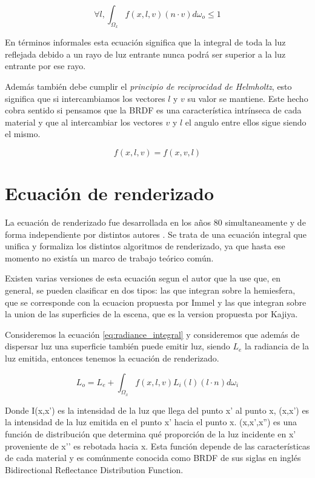 \begin{equation}
\forall l, \int_{\Omega_x} f(x,l,v) (n \cdot v) d\omega_o \leq 1
\end{equation}

En términos informales esta ecuación significa que la integral de toda la luz reflejada debido a un rayo de luz entrante nunca podrá ser superior a la luz entrante por ese rayo.

\medskip
Además también debe cumplir el \emph{principio de reciprocidad de Helmholtz}, esto significa que si intercambiamos los vectores $l$ y $v$ su valor se mantiene. Este hecho cobra sentido si pensamos que la BRDF es una característica intrínseca de cada material y que al intercambiar los vectores $v$ y $l$ el angulo entre ellos sigue siendo el mismo.

\begin{equation}
f(x, l, v) = f(x, v, l)
\end{equation} 


\clearpage

\section{Ecuación de renderizado}

La ecuación de renderizado fue desarrollada en los años 80 simultaneamente y de forma independiente por distintos autores \cite{Kajiya1986, Immel1986}. Se trata de una ecuación integral que unifica y formaliza los distintos algoritmos de renderizado, ya que hasta ese momento no existía un marco de trabajo teórico común.

\medskip
Existen varias versiones de esta ecuación segun el autor que la use que, en general, se pueden clasificar en dos tipos: las que integran sobre la hemiesfera, que se corresponde con la ecuacion propuesta por Immel y las que integran sobre la union de las superficies de la escena, que es la version propuesta por Kajiya.
\medskip

Consideremos la ecuación \ref{eq:radiance_integral}  y consideremos que además de dispersar luz una superficie también puede emitir luz, siendo $L_e$ la radiancia de la luz emitida, entonces tenemos la ecuación de renderizado.

\begin{equation}
L _ o = L_e + \int_{\Omega_x} f(x, l, v) L_i(l) (l \cdot n) d\omega_i 
\end{equation}




Donde I(x,x’) es la intensidad de la luz que llega del punto x’ al punto x, (x,x') es la intensidad de la luz emitida en el punto x’ hacia el punto x. (x,x',x'') es una función de distribución que determina qué proporción de la luz incidente en x’ proveniente de x’’ es rebotada hacia x. Esta función depende de las características de cada material y es comúnmente conocida como BRDF de sus siglas en inglés Bidirectional Reflectance Distribution Function.


